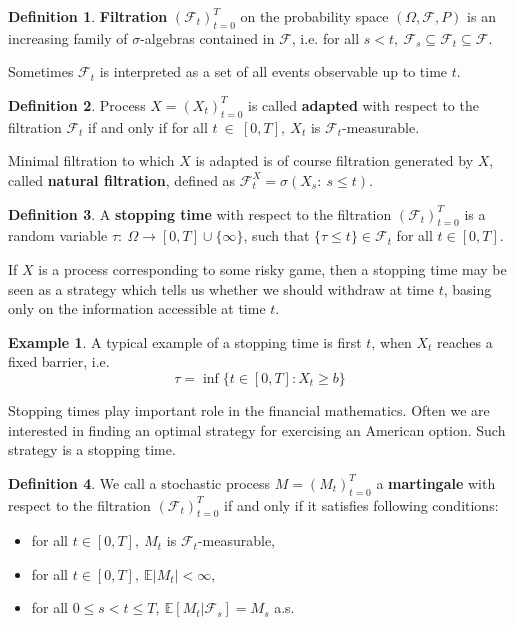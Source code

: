 \documentclass[a4paper,11pt, twoside]{book}
\theoremstyle{definition}
\newtheorem{mydef}{Definition}[chapter]
\newtheorem{example}{Example}[chapter]
\theoremstyle{remark}
\def\E{{\mathbb{E}}}
\begin{document}
\begin{mydef}
 \textbf{Filtration} $(\mathcal{F}_t)_{t=0}^T$ on the probability space $(\Omega, \mathcal{F}, {P})$ is an increasing family of $\sigma$-algebras contained in $\mathcal{F}$, i.e. for all $s<t,\ \mathcal{F}_s \subseteq \mathcal{F}_t \subseteq \mathcal{F}$.
\end{mydef}
\noindent Sometimes $\mathcal{F}_t$ is interpreted as a set of all events observable up to time $t$.

\begin{mydef}
 Process $X=(X_t)_{t=0}^T$ is called \textbf{adapted} with respect to the filtration $\mathcal{F}_t$ if and only if for all $t~\in~[0,T],\ X_t$ is $\mathcal{F}_t$-measurable.
\end{mydef}
\noindent Minimal filtration to which $X$ is adapted is of course filtration generated by $X$, called \textbf{natural filtration}, defined as $\mathcal{F}_t^X = \sigma(X_s:\ s \leq t)$.

\begin{mydef}
 A \textbf{stopping time} with respect to the filtration $(\mathcal{F}_t)_{t=0}^T$ is a random variable $\tau:\ \Omega \rightarrow [0,T]\cup\{\infty\}$, such that $\{\tau \leq t\} \in \mathcal{F}_t$ for all $t \in [0,T]$.
\end{mydef}
If $X$ is a process corresponding to some risky game, then a stopping time may be seen as a strategy which tells us whether we should withdraw at time $t$, basing only on the information accessible at time $t$.
\begin{example}
 A typical example of a stopping time is first $t$, when $X_t$ reaches a fixed barrier, i.e.
 \[\tau = \inf\{t\in[0,T]: X_t \geq b\}\]
\end{example}
\noindent Stopping times play important role in the financial mathematics. Often we are interested in finding an optimal strategy for exercising an American option. Such strategy is a stopping time.

\begin{mydef}
 We call a stochastic process $M=(M_t)_{t=0}^T$ a \textbf{martingale} with respect to the filtration $(\mathcal{F}_t)_{t=0}^T$ if and only if it satisfies following conditions:
 \begin{itemize}
  \item for all $t \in [0,T],\ M_t$ is $\mathcal{F}_t$-measurable,
  \item for all $t \in [0,T],\ \E|M_t| < \infty$,
  \item for all $0 \leq s < t \leq T,\ \E[M_t|\mathcal{F}_s] = M_s$  a.s.
 \end{itemize}
\end{mydef}
\end{document}
